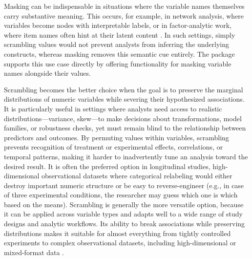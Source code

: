 \documentclass[
]{jss}
\begin{document}
Masking can be indispensable in situations where the variable names
themselves carry substantive meaning. This occurs, for example, in
network analysis, where variables become nodes with interpretable
labels, or in factor-analytic work, where item names often hint at their
latent content \citep{Hoekstra2025-ub}. In such settings, simply
scrambling values would not prevent analysts from inferring the
underlying constructs, whereas masking removes this semantic cue
entirely. The  package supports this use case directly by
offering functionality for masking variable names alongside their
values.

Scrambling becomes the better choice when the goal is to preserve the
marginal distributions of numeric variables while severing their
hypothesized associations. It is particularly useful in settings where
analysts need access to realistic distributions---variance, skew---to
make decisions about transformations, model families, or robustness
checks, yet must remain blind to the relationship between predictors and
outcomes. By permuting values within variables, scrambling prevents
recognition of treatment or experimental effects, correlations, or
temporal patterns, making it harder to inadvertently tune an analysis
toward the desired result. It is often the preferred option in
longitudinal studies, high-dimensional observational datasets where
categorical relabeling would either destroy important numeric structure
or be easy to reverse-engineer (e.g., in case of three experimental
conditions, the researcher may guess which one is which based on the
means). Scrambling is generally the more versatile option, because it
can be applied across variable types and adapts well to a wide range of
study designs and analytic workflows. Its ability to break associations
while preserving distributions makes it suitable for almost everything
from tightly controlled experiments to complex observational datasets,
including high-dimensional or mixed-format data
\citep{Sarafoglou2025-fr, Sarafoglou2023-rf}.
\end{document}
